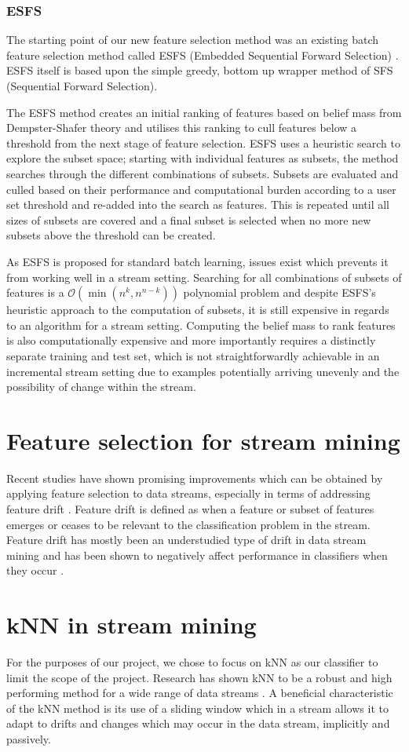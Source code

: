 \subsubsection{ESFS}
The starting point of our new feature selection method was an existing batch feature selection method called ESFS (Embedded Sequential Forward Selection) \citep{ESFS}. ESFS itself is based upon the simple greedy, bottom up wrapper method of SFS (Sequential Forward Selection).

The ESFS method creates an initial ranking of features based on belief mass from Dempster-Shafer theory \citep{dempster1967} and utilises this ranking to cull features below a threshold from the next stage of feature selection. ESFS uses a heuristic search to explore the subset space; starting with individual features as subsets, the method searches through the different combinations of subsets. Subsets are evaluated and culled based on their performance and computational burden according to a user set threshold and re-added into the search as features. This is repeated until all sizes of subsets are covered and a final subset is selected when no more new subsets above the threshold can be created.

As ESFS is proposed for standard batch learning, issues exist which prevents it from working well in a stream setting. Searching for all combinations of subsets of features is a $\mathcal{O}(\min \left(n^k, n^{n-k}\right))$ polynomial problem and despite ESFS's heuristic approach to the computation of subsets, it is still expensive in regards to an algorithm for a stream setting. Computing the belief mass to rank features is also computationally expensive and more importantly requires a distinctly separate training and test set, which is not straightforwardly achievable in an incremental stream setting due to examples potentially arriving unevenly and the possibility of change within the stream.

\section{Feature selection for stream mining}
Recent studies have shown promising improvements which can be obtained by applying feature selection to data streams, especially in terms of addressing feature drift \citep{Barddal2016}. Feature drift is defined as when a feature or subset of features emerges or ceases to be relevant to the classification problem in the stream. Feature drift has mostly been an understudied type of drift in data stream mining and has been shown to negatively affect performance in classifiers when they occur \citep{Barddal2015}.

\section{kNN in stream mining}
For the purposes of our project, we chose to focus on kNN as our classifier to limit the scope of the project. Research has shown kNN to be a robust and high performing method for a wide range of data streams \citep{Read2012}. A beneficial characteristic of the kNN method is its use of a sliding window which in a stream allows it to adapt to drifts and changes which may occur in the data stream, implicitly and passively.